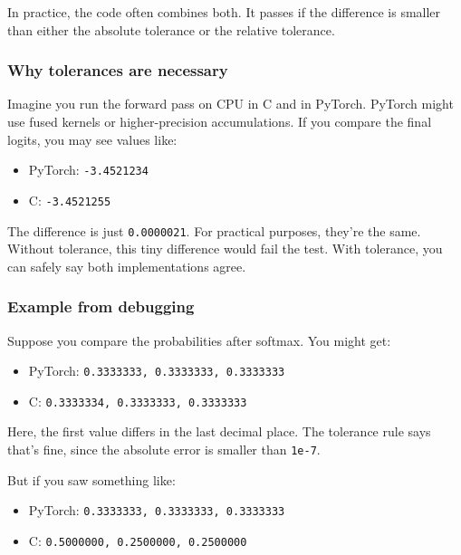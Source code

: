 \documentclass[
  letterpaper,
  DIV=11,
  numbers=noendperiod]{scrreprt}
\providecommand{\tightlist}{%
  \setlength{\itemsep}{0pt}\setlength{\parskip}{0pt}}
\begin{document}
In practice, the code often combines both. It passes if the difference
is smaller than either the absolute tolerance or the relative tolerance.

\subsubsection{Why tolerances are
necessary}\label{why-tolerances-are-necessary}

Imagine you run the forward pass on CPU in C and in PyTorch. PyTorch
might use fused kernels or higher-precision accumulations. If you
compare the final logits, you may see values like:

\begin{itemize}
\tightlist
\item
  PyTorch: \texttt{-3.4521234}
\item
  C: \texttt{-3.4521255}
\end{itemize}

The difference is just \texttt{0.0000021}. For practical purposes,
they're the same. Without tolerance, this tiny difference would fail the
test. With tolerance, you can safely say both implementations agree.

\subsubsection{Example from debugging}\label{example-from-debugging}

Suppose you compare the probabilities after softmax. You might get:

\begin{itemize}
\tightlist
\item
  PyTorch: \texttt{0.3333333,\ 0.3333333,\ 0.3333333}
\item
  C: \texttt{0.3333334,\ 0.3333333,\ 0.3333333}
\end{itemize}

Here, the first value differs in the last decimal place. The tolerance
rule says that's fine, since the absolute error is smaller than
\texttt{1e-7}.

But if you saw something like:

\begin{itemize}
\tightlist
\item
  PyTorch: \texttt{0.3333333,\ 0.3333333,\ 0.3333333}
\item
  C: \texttt{0.5000000,\ 0.2500000,\ 0.2500000}
\end{itemize}
\end{document}
